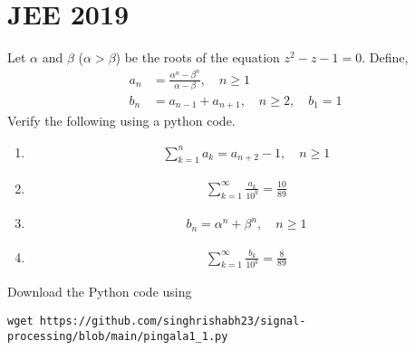 \documentclass[journal,12pt,twocolumn]{IEEEtran}
\renewcommand\thesection{\arabic{section}}
\begin{document}
	\section{JEE 2019}
	\noindent Let $\alpha$ and $\beta$ ($\alpha > \beta$) be the roots of the
	equation $z^2 - z - 1 = 0$. Define,
	\begin{align}
		a_n &= \frac{\alpha^{n}-\beta^{n}}{\alpha - \beta}, \quad n \ge 1
		\\
		b_n &= a_{n-1} + a_{n+1}, \quad n \ge 2, \quad b_1 =1
		\label{eq:10-orig-diff}
	\end{align}
	Verify the following using a python code.
	\begin{enumerate}[label=\thesection.\arabic*
		,ref=\thesection.\theenumi]
		\item 
		\begin{align}
			\sum_{k=1}^{n}a_k = a_{n+2}-1, \quad n \ge 1
		\end{align}
		\item 
		\begin{align}
			\sum_{k=1}^{\infty}\frac{a_k}{10^k} =\frac{10}{89}
		\end{align}
		\item 
		\begin{align}
			b_n =\alpha^n + \beta^n, \quad n \ge 1
		\end{align}
		\item 
		\begin{align}
			\sum_{k=1}^{\infty}\frac{b_k}{10^k} =\frac{8}{89}
		\end{align}
	\end{enumerate}
	Download the Python code using
	\begin{lstlisting}
wget https://github.com/singhrishabh23/signal-processing/blob/main/pingala1_1.py
	\end{lstlisting}
\end{document}
